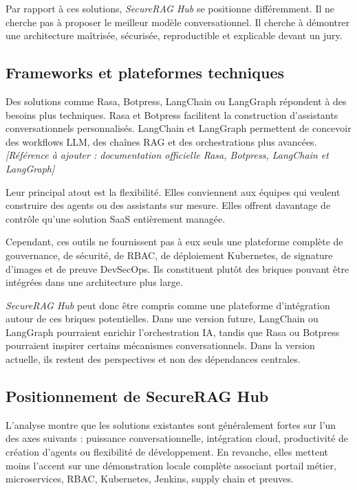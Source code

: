 Par rapport à ces solutions, \textit{SecureRAG Hub} se positionne différemment. Il ne cherche pas à proposer le meilleur modèle conversationnel. Il cherche à démontrer une architecture maîtrisée, sécurisée, reproductible et explicable devant un jury.

\subsection{Frameworks et plateformes techniques}

Des solutions comme Rasa, Botpress, LangChain ou LangGraph répondent à des besoins plus techniques. Rasa et Botpress facilitent la construction d'assistants conversationnels personnalisés. LangChain et LangGraph permettent de concevoir des workflows LLM, des chaînes RAG et des orchestrations plus avancées. \textit{[Référence à ajouter : documentation officielle Rasa, Botpress, LangChain et LangGraph]}

Leur principal atout est la flexibilité. Elles conviennent aux équipes qui veulent construire des agents ou des assistants sur mesure. Elles offrent davantage de contrôle qu'une solution SaaS entièrement managée.

Cependant, ces outils ne fournissent pas à eux seuls une plateforme complète de gouvernance, de sécurité, de RBAC, de déploiement Kubernetes, de signature d'images et de preuve DevSecOps. Ils constituent plutôt des briques pouvant être intégrées dans une architecture plus large.

\textit{SecureRAG Hub} peut donc être compris comme une plateforme d'intégration autour de ces briques potentielles. Dans une version future, LangChain ou LangGraph pourraient enrichir l'orchestration IA, tandis que Rasa ou Botpress pourraient inspirer certains mécanismes conversationnels. Dans la version actuelle, ils restent des perspectives et non des dépendances centrales.

\subsection{Positionnement de SecureRAG Hub}

L'analyse montre que les solutions existantes sont généralement fortes sur l'un des axes suivants : puissance conversationnelle, intégration cloud, productivité de création d'agents ou flexibilité de développement. En revanche, elles mettent moins l'accent sur une démonstration locale complète associant portail métier, microservices, RBAC, Kubernetes, Jenkins, supply chain et preuves.


